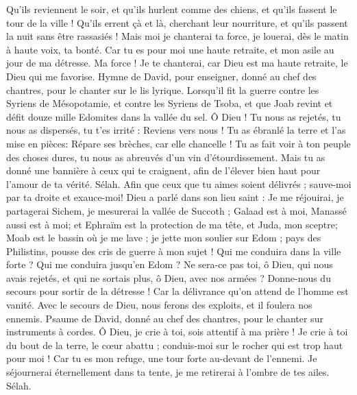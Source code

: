 \begin{multicols}{2}
Qu'ils reviennent le soir, et qu'ils hurlent comme des chiens, et qu'ils fassent le tour de la ville !
Qu'ils errent çà et là, cherchant leur nourriture, et qu'ils passent la nuit sans être rassasiés !
Mais moi je chanterai ta force, je louerai, dès le matin à haute voix, ta bonté. Car tu es pour moi une haute retraite, et mon asile au jour de ma détresse.
Ma force ! Je te chanterai, car Dieu est ma haute retraite, le Dieu qui me favorise.
\VerseOne{}Hymne de David, pour enseigner, donné au chef des chantres, pour le chanter sur le lis lyrique.
Lorsqu'il fit la guerre contre les Syriens de Mésopotamie, et contre les Syriens de Tsoba, et que Joab revint et défit douze mille Edomites dans la vallée du sel.
Ô Dieu ! Tu nous as rejetés, tu nous as dispersés, tu t'es irrité : Reviens vers nous !
Tu as ébranlé la terre et l'as mise en pièces: Répare ses brèches, car elle chancelle !
Tu as fait voir à ton peuple des choses dures, tu nous as abreuvés d'un vin d'étourdissement.
Mais tu as donné une bannière à ceux qui te craignent, afin de l'élever bien haut pour l'amour de ta vérité. Sélah.
Afin que ceux que tu aimes soient délivrés ; sauve-moi par ta droite et exauce-moi!
Dieu a parlé dans son lieu saint : Je me réjouirai, je partagerai Sichem, je mesurerai la vallée de Succoth ;
Galaad est à moi, Manassé aussi est à moi; et Ephraïm est la protection de ma tête, et Juda, mon sceptre;
Moab est le bassin où je me lave ; je jette mon soulier sur Edom ; pays des Philistins, pousse des cris de guerre à mon sujet !
Qui me conduira dans la ville forte ? Qui me conduira jusqu'en Edom ?
Ne sera-ce pas toi, ô Dieu, qui nous avais rejetés, et qui ne sortais plus, ô Dieu, avec nos armées ?
Donne-nous du secours pour sortir de la détresse ! Car la délivrance qu'on attend de l'homme est vanité.
Avec le secours de Dieu, nous ferons des exploits, et il foulera nos ennemis.
\VerseOne{}Psaume de David, donné au chef des chantres, pour le chanter sur instruments à cordes.
Ô Dieu, je crie à toi, sois attentif à ma prière !
Je crie à toi du bout de la terre, le cœur abattu ; conduis-moi sur le rocher qui est trop haut pour moi !
Car tu es mon refuge, une tour forte au-devant de l'ennemi.
Je séjournerai éternellement dans ta tente, je me retirerai à l'ombre de tes ailes. Sélah.

\end{multicols}
